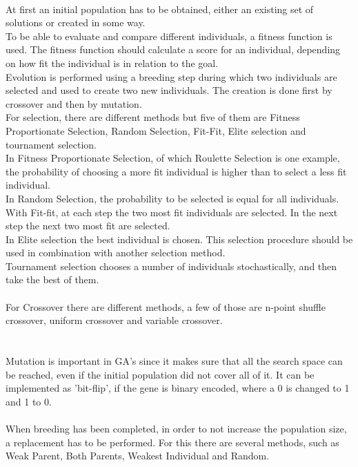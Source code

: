 \\At first an initial population has to be obtained, either an existing set of solutions or created in some way.\\
To be able to evaluate and compare different individuals, a fitness function is used. The fitness function should calculate a score for an individual, depending on how fit the individual is in relation to the goal.\\
Evolution is performed using a breeding step during which two individuals are selected and used to create two new individuals. The creation is done first by crossover and then by mutation.\\
For selection, there are different methods but five of them are Fitness Proportionate Selection, Random Selection, Fit-Fit, Elite selection and tournament selection.\\
In Fitness Proportionate Selection, of which Roulette Selection is one example, the probability of choosing a more fit individual is higher than to select a less fit individual.\\
In Random Selection, the probability to be selected is equal for all individuals. \\
With Fit-fit, at each step the two most fit individuals are selected. In the next step the next two most fit are selected.\\
In Elite selection the best individual is chosen. This selection procedure should be used in combination with another selection method.\\
Tournament selection chooses a number of individuals stochastically, and then take the best of them.\\
\\
For Crossover there are different methods, a few of those are n-point shuffle crossover, uniform crossover and variable crossover.\\
\\
\\Mutation is important in GA's since it makes sure that all the search space can be reached, even if the initial population did not cover all of it. It can be implemented as 'bit-flip', if the gene is binary encoded, where a 0 is changed to 1 and 1 to 0.\\
\\
When breeding has been completed, in order to not increase the population size, a replacement has to be performed. For this there are several methods, such as Weak Parent, Both Parents, Weakest Individual and Random.\\
